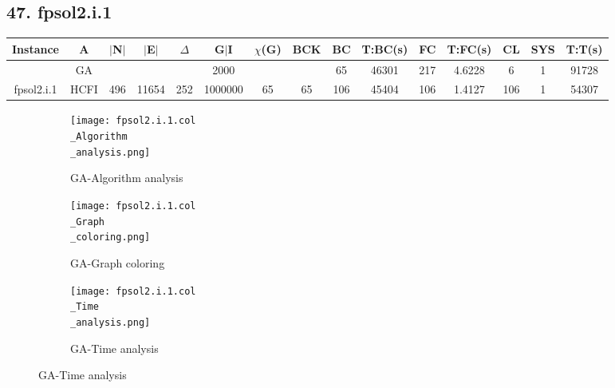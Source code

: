 \documentclass[10pt]{article}
\begin{document}
\subsection*{\hspace{0,9073976cm} 47. fpsol2.i.1 }
\begin{table}[H]
\centering
\begin{tabular}{|c|c|c|c|c|c|c|c|c|c|c|c|c|c|c|}
\hline
Instance& A &$|$N$|$ & $|$E$|$ & $\Delta$ & G$|$I & $\chi$(G) &BCK&BC & T:BC(s) & FC & T:FC(s) & CL & SYS & T:T(s) \\ \hline \hline

	&GA&       &                   &                     &   2000      &     \cellcolor{yellow} & {\cellcolor{yellow}}& {{\cellcolor{green}65}}
&46301   &217        &4.6228                   &6                    &1          &91728        \\ \cline{2-2} \cline{6-6} \cline{9-15}
 \multirow{-2}{*}{fpsol2.i.1} &HCFI   &\multirow{-2}{*}{496}   &\multirow{-2}{*}{11654}     &\multirow{-2}{*}{252}     &1000000     &\multirow{-2}{*}{\cellcolor{yellow}65}      & \multirow{-2}{*}{\cellcolor{yellow}65}    &{\cellcolor{green}106}     &45404         &106    &        1.4127 &106    &1     &54307        \\ \hline
\end{tabular}
\end{table}
\graphicspath{{./Core1/Solutions/GA/fpsol2.i.1.col}}
\begin{figure}[H]
\begin{subfigure}{.33\textwidth}
  \centering
  \texttt{[image: fpsol2.i.1.col\\\_Algorithm\\\_analysis.png]}
  \caption{GA-Algorithm analysis}
   \label{fig:subfig1}
\end{subfigure}%
\begin{subfigure}{.33\textwidth}
  \centering
  \texttt{[image: fpsol2.i.1.col\\\_Graph\\\_coloring.png]}
  \caption{GA-Graph coloring}
  \label{fig:subfig2}
\end{subfigure}
\begin{subfigure}{.33\textwidth}
  \centering
  \texttt{[image: fpsol2.i.1.col\\\_Time\\\_analysis.png]}
  \caption{GA-Time analysis}
  \end{subfigure}
\end{figure}
\end{document}
